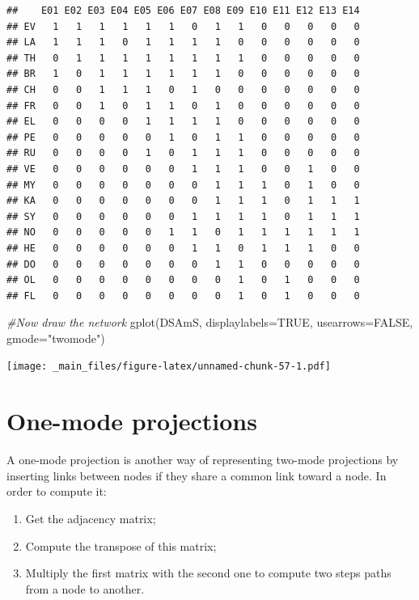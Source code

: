 \documentclass[
  notitlepage,
  onecolumn,
  openany]{book}
\newenvironment{Shaded}{\begin{snugshade}}{\end{snugshade}}
\newcommand{\AttributeTok}[1]{\textcolor[rgb]{0.77,0.63,0.00}{#1}}
\newcommand{\CommentTok}[1]{\textcolor[rgb]{0.56,0.35,0.01}{\textit{#1}}}
\newcommand{\ConstantTok}[1]{\textcolor[rgb]{0.00,0.00,0.00}{#1}}
\newcommand{\FunctionTok}[1]{\textcolor[rgb]{0.00,0.00,0.00}{#1}}
\newcommand{\NormalTok}[1]{#1}
\newcommand{\StringTok}[1]{\textcolor[rgb]{0.31,0.60,0.02}{#1}}
\providecommand{\tightlist}{%
  \setlength{\itemsep}{0pt}\setlength{\parskip}{0pt}}
\begin{document}
\begin{verbatim}
##    E01 E02 E03 E04 E05 E06 E07 E08 E09 E10 E11 E12 E13 E14
## EV   1   1   1   1   1   1   0   1   1   0   0   0   0   0
## LA   1   1   1   0   1   1   1   1   0   0   0   0   0   0
## TH   0   1   1   1   1   1   1   1   1   0   0   0   0   0
## BR   1   0   1   1   1   1   1   1   0   0   0   0   0   0
## CH   0   0   1   1   1   0   1   0   0   0   0   0   0   0
## FR   0   0   1   0   1   1   0   1   0   0   0   0   0   0
## EL   0   0   0   0   1   1   1   1   0   0   0   0   0   0
## PE   0   0   0   0   0   1   0   1   1   0   0   0   0   0
## RU   0   0   0   0   1   0   1   1   1   0   0   0   0   0
## VE   0   0   0   0   0   0   1   1   1   0   0   1   0   0
## MY   0   0   0   0   0   0   0   1   1   1   0   1   0   0
## KA   0   0   0   0   0   0   0   1   1   1   0   1   1   1
## SY   0   0   0   0   0   0   1   1   1   1   0   1   1   1
## NO   0   0   0   0   0   1   1   0   1   1   1   1   1   1
## HE   0   0   0   0   0   0   1   1   0   1   1   1   0   0
## DO   0   0   0   0   0   0   0   1   1   0   0   0   0   0
## OL   0   0   0   0   0   0   0   0   1   0   1   0   0   0
## FL   0   0   0   0   0   0   0   0   1   0   1   0   0   0
\end{verbatim}

\begin{Shaded}
\begin{Highlighting}[]
\CommentTok{\#Now draw the network}
\FunctionTok{gplot}\NormalTok{(DSAmS, }\AttributeTok{displaylabels=}\ConstantTok{TRUE}\NormalTok{, }
      \AttributeTok{usearrows=}\ConstantTok{FALSE}\NormalTok{, }\AttributeTok{gmode=}\StringTok{"twomode"}\NormalTok{)}
\end{Highlighting}
\end{Shaded}

\texttt{[image: \_main\_files/figure-latex/unnamed-chunk-57-1.pdf]}

\hypertarget{one-mode-projections}{%
\section{One-mode projections}\label{one-mode-projections}}

A one-mode projection is another way of representing two-mode projections by inserting links between nodes if they share a common link toward a node. In order to compute it:

\begin{enumerate}
\def\labelenumi{\arabic{enumi}.}
\tightlist
\item
  Get the adjacency matrix;
\item
  Compute the transpose of this matrix;
\item
  Multiply the first matrix with the second one to compute two steps paths from a node to another.
\end{enumerate}
\end{document}
